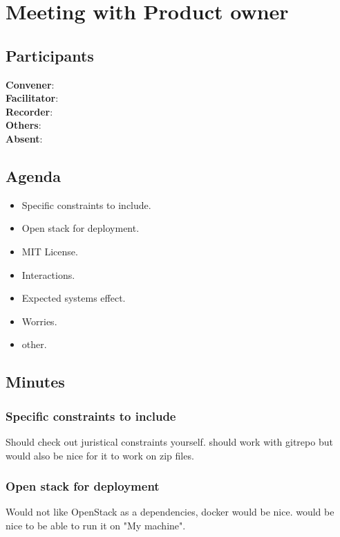 \section*{Meeting with Product owner}

\subsection*{Participants}
\textbf{Convener}: \productowner{}\\
\textbf{Facilitator}: \facilitator{}  \\
\textbf{Recorder}: \scrummaster{}  \\
\textbf{Others}: \groupleader{} \\
\textbf{Absent}: 

\subsection*{Agenda}
\begin{itemize}
    \item Specific constraints to include.
    \item Open stack for deployment.
    \item MIT License.
    \item Interactions.
    \item Expected systems effect. 
    \item Worries.
    \item other.
\end{itemize}

\subsection*{Minutes}

\subsubsection*{Specific constraints to include}

Should check out juristical constraints yourself.
should work with gitrepo but would also be nice for it to work on zip files.

\subsubsection*{Open stack for deployment}
Would not like OpenStack as a dependencies, docker would be nice. would be nice to be able to run it on "My machine". 

